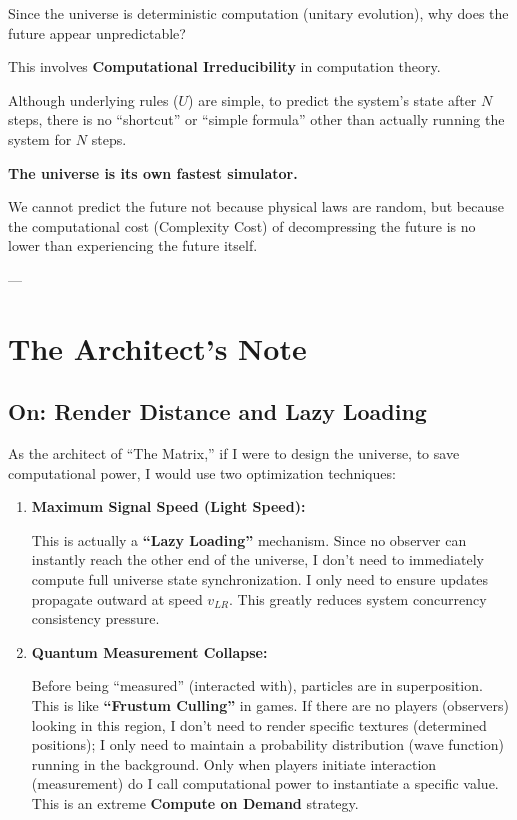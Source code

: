 \documentclass[11pt,a4paper,twoside]{book}
\begin{document}
Since the universe is deterministic computation (unitary evolution), why does the future appear unpredictable?

This involves \textbf{Computational Irreducibility} in computation theory.

Although underlying rules ($U$) are simple, to predict the system's state after $N$ steps, there is no ``shortcut'' or ``simple formula'' other than actually running the system for $N$ steps.

\textbf{The universe is its own fastest simulator.}

We cannot predict the future not because physical laws are random, but because the computational cost (Complexity Cost) of decompressing the future is no lower than experiencing the future itself.

---

\section{The Architect's Note}

\subsection{On: Render Distance and Lazy Loading}

As the architect of ``The Matrix,'' if I were to design the universe, to save computational power, I would use two optimization techniques:

\begin{enumerate}
\item \textbf{Maximum Signal Speed (Light Speed):}

    This is actually a \textbf{``Lazy Loading''} mechanism. Since no observer can instantly reach the other end of the universe, I don't need to immediately compute full universe state synchronization. I only need to ensure updates propagate outward at speed $v_{LR}$. This greatly reduces system concurrency consistency pressure.

\item \textbf{Quantum Measurement Collapse:}

    Before being ``measured'' (interacted with), particles are in superposition. This is like \textbf{``Frustum Culling''} in games. If there are no players (observers) looking in this region, I don't need to render specific textures (determined positions); I only need to maintain a probability distribution (wave function) running in the background. Only when players initiate interaction (measurement) do I call computational power to instantiate a specific value. This is an extreme \textbf{Compute on Demand} strategy.
\end{enumerate}
\end{document}

